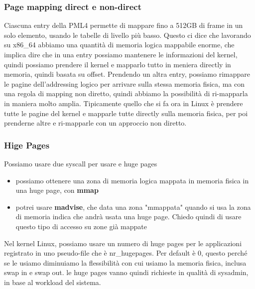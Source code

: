 \documentclass[12pt, oneside]{extbook}
\begin{document}
\subsubsection{Page mapping direct e non-direct}
Ciascuna entry della PML4 permette di mappare fino a 512GB di frame in un solo elemento, usando le tabelle di livello più basso. Questo ci dice che lavorando su x86\_64 abbiamo una quantità di memoria logica mappabile enorme, che implica dire che in una entry possiamo mantenere le informazioni del kernel, quindi possiamo prendere il kernel e mapparlo tutto in meniera directly in memoria, quindi basata su offset. Prendendo un altra entry, possiamo rimappare le pagine dell'addressing logico per arrivare sulla stessa memoria fisica, ma con una regola di mapping non diretto, quindi abbiamo la possibilità di ri-mapparla in maniera molto amplia. Tipicamente quello che si fa ora in Linux è prendere tutte le pagine del kernel e mapparle tutte directly sulla memoria fisica, per poi prenderne altre e ri-mapparle con un approccio non diretto.
\subsubsection{Hige Pages}
Possiamo usare due syscall per usare e huge pages
\begin{itemize}
\item possiamo ottenere una zona di memoria logica mappata in memoria fisica in una huge page, con \textbf{mmap}
\item potrei usare \textbf{madvise}, che data una zona "mmappata" quando si usa la zona di memoria indica che andrà usata una huge page. Chiedo quindi di usare questo tipo di accesso su zone già mappate
\end{itemize}
Nel kernel Linux, possiamo usare un numero di huge pages per le applicazioni registrato in uno pseudo-file che è \textsf{nr\_hugepages}. Per default è 0, questo perché se le usiamo diminuiamo la flessibilità con cui usiamo la memoria fisica, inclusa swap in e swap out. le huge pages vanno quindi richieste in qualità di sysadmin, in base al workload del sistema.
\end{document}
